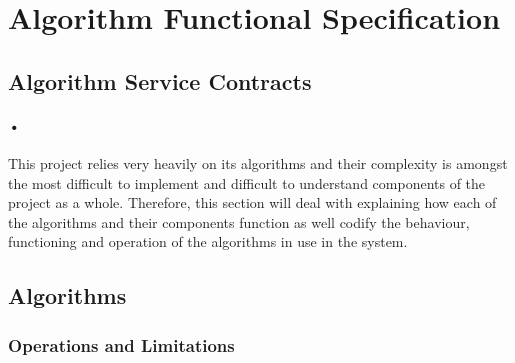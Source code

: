 \documentclass[11pt]{article}
\begin{document}
\section{Algorithm Functional Specification}
\subsection{Algorithm Service Contracts}
\paragraph{•}
This project relies very heavily on its algorithms and their complexity is amongst the most difficult to implement and difficult to understand components of the project as a whole. Therefore, this section will deal with explaining how each of the algorithms and their components function as well codify the behaviour, functioning and operation of the algorithms in use in the system. 
\subsection{Algorithms}
\subsubsection{Operations and Limitations}
\end{document}

